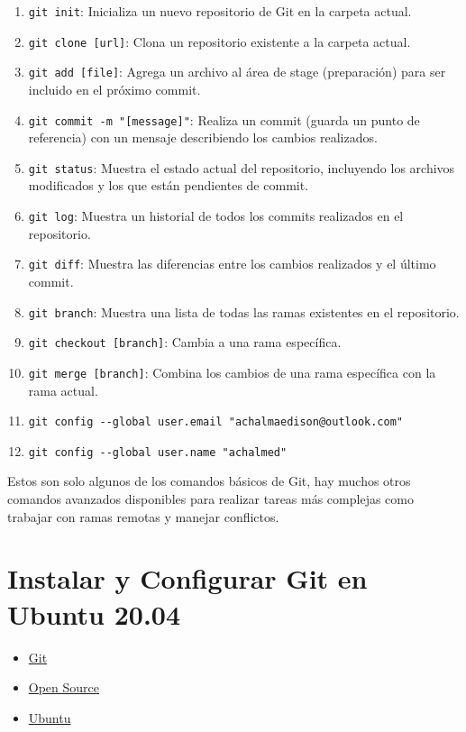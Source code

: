 \documentclass[
  a2paper,
]{article}
\providecommand{\tightlist}{%
  \setlength{\itemsep}{0pt}\setlength{\parskip}{0pt}}\usepackage{longtable,booktabs,array}
\begin{document}
\begin{enumerate}
\def\labelenumi{\arabic{enumi}.}
\tightlist
\item
  \texttt{git\ init}: Inicializa un nuevo repositorio de Git en la
  carpeta actual.
\item
  \texttt{git\ clone\ {[}url{]}}: Clona un repositorio existente a la
  carpeta actual.
\item
  \texttt{git\ add\ {[}file{]}}: Agrega un archivo al área de stage
  (preparación) para ser incluido en el próximo commit.
\item
  \texttt{git\ commit\ -m\ "{[}message{]}"}: Realiza un commit (guarda
  un punto de referencia) con un mensaje describiendo los cambios
  realizados.
\item
  \texttt{git\ status}: Muestra el estado actual del repositorio,
  incluyendo los archivos modificados y los que están pendientes de
  commit.
\item
  \texttt{git\ log}: Muestra un historial de todos los commits
  realizados en el repositorio.
\item
  \texttt{git\ diff}: Muestra las diferencias entre los cambios
  realizados y el último commit.
\item
  \texttt{git\ branch}: Muestra una lista de todas las ramas existentes
  en el repositorio.
\item
  \texttt{git\ checkout\ {[}branch{]}}: Cambia a una rama específica.
\item
  \texttt{git\ merge\ {[}branch{]}}: Combina los cambios de una rama
  específica con la rama actual.
\item
  \texttt{git\ config\ -\/-global\ user.email\ "achalmaedison@outlook.com"}
\item
  \texttt{git\ config\ -\/-global\ user.name\ "achalmed"}
\end{enumerate}

Estos son solo algunos de los comandos básicos de Git, hay muchos otros
comandos avanzados disponibles para realizar tareas más complejas como
trabajar con ramas remotas y manejar conflictos.

\hypertarget{instalar-y-configurar-git-en-ubuntu-20.04}{%
\section{Instalar y Configurar Git en Ubuntu
20.04}\label{instalar-y-configurar-git-en-ubuntu-20.04}}

\begin{itemize}
\tightlist
\item
  \href{https://www.digitalocean.com/community/tags/git}{Git}
\item
  \href{https://www.digitalocean.com/community/tags/open-source}{Open
  Source}
\item
  \href{https://www.digitalocean.com/community/tags/ubuntu}{Ubuntu}
\end{itemize}
\end{document}
